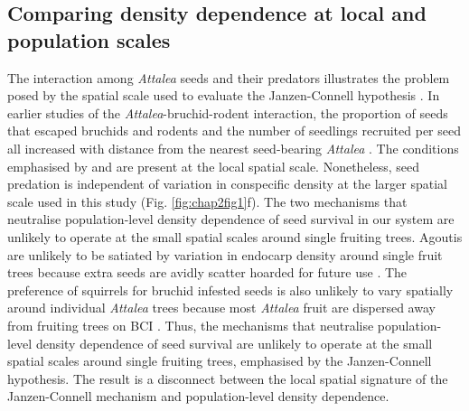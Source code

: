 \documentclass[b5paper,justified]{tufte-book} %
\begin{document}
\begin{fullwidth}
\subsection{Comparing density dependence at local and population scales}
The interaction among \textit{Attalea} seeds and their predators illustrates the problem posed by the spatial scale used to evaluate the Janzen-Connell hypothesis \citep{Schupp1992}. In earlier studies of the \textit{Attalea}-bruchid-rodent interaction, the proportion of seeds that escaped bruchids and rodents and the number of seedlings recruited per seed all increased with distance from the nearest seed-bearing \textit{Attalea} \citep{Wright1983, Wright2001a}. The conditions emphasised by \citet{Janzen1970} and \citet{Connell1971} are present at the local spatial scale. Nonetheless, seed predation is independent of variation in conspecific density at the larger spatial scale used in this study (Fig. \ref{fig:chap2fig1}f). The two mechanisms that neutralise population-level density dependence of
seed survival in our system are unlikely to operate at the small spatial scales around single fruiting trees. Agoutis are unlikely to be satiated by variation in endocarp density around single fruit trees because extra seeds are avidly scatter hoarded for future use \citep{Forget1994}. The preference of squirrels for bruchid infested seeds is also unlikely to vary spatially around individual \textit{Attalea} trees because most \textit{Attalea} fruit are dispersed away from fruiting trees on BCI \citep{Wright2000, Wright2001a}. Thus, the mechanisms that neutralise population-level density dependence of seed survival are unlikely to operate at the small spatial scales around single fruiting trees, emphasised by the Janzen-Connell hypothesis. The result is a disconnect between the local spatial signature of the Janzen-Connell mechanism and population-level density dependence.


\end{fullwidth}
\end{document}
